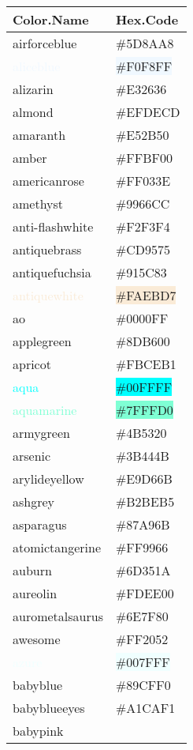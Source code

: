 \documentclass[
]{article}
\begin{document}
\begin{longtable}[]{@{}ll@{}}
\toprule
Color.Name & Hex.Code\tabularnewline
\midrule
\endhead
\textcolor{airforceblue}{airforceblue} &
\colorbox{airforceblue}{\#5D8AA8}\tabularnewline
\textcolor{aliceblue}{aliceblue} &
\colorbox{aliceblue}{\#F0F8FF}\tabularnewline
\textcolor{alizarin}{alizarin} &
\colorbox{alizarin}{\#E32636}\tabularnewline
\textcolor{almond}{almond} & \colorbox{almond}{\#EFDECD}\tabularnewline
\textcolor{amaranth}{amaranth} &
\colorbox{amaranth}{\#E52B50}\tabularnewline
\textcolor{amber}{amber} & \colorbox{amber}{\#FFBF00}\tabularnewline
\textcolor{americanrose}{americanrose} &
\colorbox{americanrose}{\#FF033E}\tabularnewline
\textcolor{amethyst}{amethyst} &
\colorbox{amethyst}{\#9966CC}\tabularnewline
\textcolor{anti-flashwhite}{anti-flashwhite} &
\colorbox{anti-flashwhite}{\#F2F3F4}\tabularnewline
\textcolor{antiquebrass}{antiquebrass} &
\colorbox{antiquebrass}{\#CD9575}\tabularnewline
\textcolor{antiquefuchsia}{antiquefuchsia} &
\colorbox{antiquefuchsia}{\#915C83}\tabularnewline
\textcolor{antiquewhite}{antiquewhite} &
\colorbox{antiquewhite}{\#FAEBD7}\tabularnewline
\textcolor{ao}{ao} & \colorbox{ao}{\#0000FF}\tabularnewline
\textcolor{applegreen}{applegreen} &
\colorbox{applegreen}{\#8DB600}\tabularnewline
\textcolor{apricot}{apricot} &
\colorbox{apricot}{\#FBCEB1}\tabularnewline
\textcolor{aqua}{aqua} & \colorbox{aqua}{\#00FFFF}\tabularnewline
\textcolor{aquamarine}{aquamarine} &
\colorbox{aquamarine}{\#7FFFD0}\tabularnewline
\textcolor{armygreen}{armygreen} &
\colorbox{armygreen}{\#4B5320}\tabularnewline
\textcolor{arsenic}{arsenic} &
\colorbox{arsenic}{\#3B444B}\tabularnewline
\textcolor{arylideyellow}{arylideyellow} &
\colorbox{arylideyellow}{\#E9D66B}\tabularnewline
\textcolor{ashgrey}{ashgrey} &
\colorbox{ashgrey}{\#B2BEB5}\tabularnewline
\textcolor{asparagus}{asparagus} &
\colorbox{asparagus}{\#87A96B}\tabularnewline
\textcolor{atomictangerine}{atomictangerine} &
\colorbox{atomictangerine}{\#FF9966}\tabularnewline
\textcolor{auburn}{auburn} & \colorbox{auburn}{\#6D351A}\tabularnewline
\textcolor{aureolin}{aureolin} &
\colorbox{aureolin}{\#FDEE00}\tabularnewline
\textcolor{aurometalsaurus}{aurometalsaurus} &
\colorbox{aurometalsaurus}{\#6E7F80}\tabularnewline
\textcolor{awesome}{awesome} &
\colorbox{awesome}{\#FF2052}\tabularnewline
\textcolor{azure}{azure} & \colorbox{azure}{\#007FFF}\tabularnewline
\textcolor{babyblue}{babyblue} &
\colorbox{babyblue}{\#89CFF0}\tabularnewline
\textcolor{babyblueeyes}{babyblueeyes} &
\colorbox{babyblueeyes}{\#A1CAF1}\tabularnewline
\textcolor{babypink}{babypink} &

\end{longtable}
\end{document}
